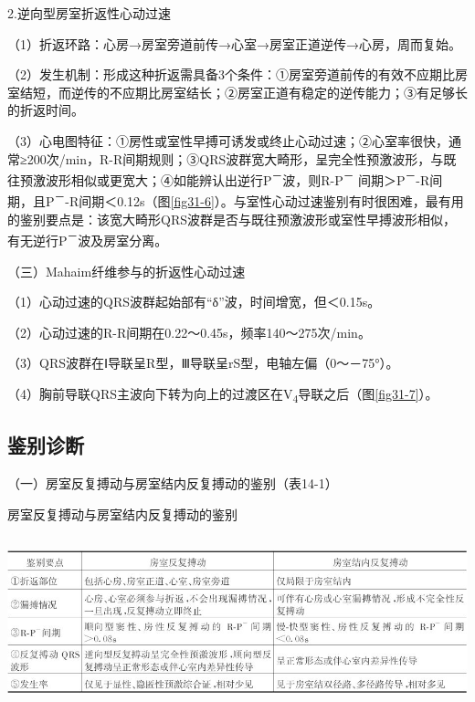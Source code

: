 2.逆向型房室折返性心动过速

（1）折返环路：心房→房室旁道前传→心室→房室正道逆传→心房，周而复始。

（2）发生机制：形成这种折返需具备3个条件：①房室旁道前传的有效不应期比房室结短，而逆传的不应期比房室结长；②房室正道有稳定的逆传能力；③有足够长的折返时间。

（3）心电图特征：①房性或室性早搏可诱发或终止心动过速；②心室率很快，通常≥200次/min，R-R间期规则；③QRS波群宽大畸形，呈完全性预激波形，与既往预激波形相似或更宽大；④如能辨认出逆行P\textsuperscript{－}波，则R-P\textsuperscript{－} 间期＞P\textsuperscript{－}-R间期，且P\textsuperscript{－}-R间期＜0.12s（图\ref{fig31-6}）。与室性心动过速鉴别有时很困难，最有用的鉴别要点是：该宽大畸形QRS波群是否与既往预激波形或室性早搏波形相似，有无逆行P\textsuperscript{－}波及房室分离。

（三）Mahaim纤维参与的折返性心动过速

（1）心动过速的QRS波群起始部有“δ”波，时间增宽，但＜0.15s。

（2）心动过速的R-R间期在0.22～0.45s，频率140～275次/min。

（3）QRS波群在Ⅰ导联呈R型，Ⅲ导联呈rS型，电轴左偏（0～－75°）。

（4）胸前导联QRS主波向下转为向上的过渡区在V\textsubscript{4}导联之后（图\ref{fig31-7}）。

\protect\hypertarget{text00021.htmlux5cux23subid248}{}{}

\subsection{鉴别诊断}

（一）房室反复搏动与房室结内反复搏动的鉴别（表14-1）

\begin{table}[htbp]
\centering
\caption{房室反复搏动与房室结内反复搏动的鉴别}
\label{tab14-1}
\includegraphics[width=6.21875in,height=1.95833in]{./images/Image00265.jpg}
\end{table}

